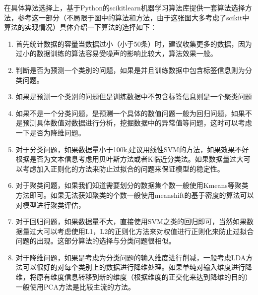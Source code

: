 \documentclass[letterpaper,10pt,english]{sphinxmanual}
\begin{document}
在具体算法选择上，基于Python的scikit\sphinxhyphen{}learn机器学习算法库提供一套算法选择方法，参考这一部分（不局限于图中的算法和方法，由于这张图大多考虑了scikit中算法的实现情况）具体介绍一下算法的选择如下：
%
\begin{footnote}[926]\sphinxAtStartFootnote
{}
%
\end{footnote}
\begin{enumerate}
%
\item {} 
首先统计数据的容量当数据过小（小于50条）时，建议收集更多的数据，因为过小的数据训练的算法容易受噪声的影响比较大，算法效果一般。

\item {} 
判断是否为预测一个类别的问题，如果是并且训练数据中包含标签信息则为分类问题。

\item {} 
如果是预测一个类别的问题但是训练数据中不包含标签信息则是一个聚类问题

\item {} 
如果不是一个分类问题，是预测一个具体的数值问题一般为回归问题，如果不是预测具体数值对数据进行分析，挖掘数据中的异常值等问题，这时可以考虑一下是否为降维问题。

\item {} 
对于分类问题，如果数据量小于100k,建议用线性SVM的方法，如果效果不好根据是否为文本信息考虑用贝叶斯方法或者K临近分类法。如果数据量过大可以考虑加入正则化的方法来防止过拟合的问题来保证模型的稳定性。

\item {} 
对于聚类问题，如果我们知道需要划分的数据集个数一般使用Kmeans等聚类方法即可。如果无法获知聚类的个数一般使用mean\sphinxhyphen{}shift的基于密度的算法可以对模型进行聚类评估，

\item {} 
对于回归问题，如果数据量不大，直接使用SVM之类的回归即可，当然如果数据量过大可以考虑使用L1，L2的正则化方法来对权值进行正则化来防止过拟合问题的出现。这部分算法的选择与分类问题很相似。

\item {} 
对于降维问题，如果是考虑为分类问题的输入维度进行削减，一般考虑LDA方法可以很好的对每个类别上的数据进行降维处理。如果单纯对输入维度进行降维，将原有维度信息转移到新的维度（根据维度的正交化来达到降维的目的）一般使用PCA方法是比较主流的方法。

\end{enumerate}
\end{document}
